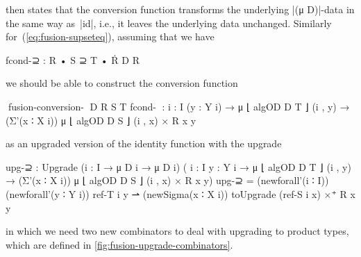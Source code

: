 then states that the conversion function transforms the underlying |(μ D)|-data in the same way as~|id|, i.e., it leaves the underlying data unchanged.
Similarly for~(\ref{eq:fusion-supseteq}), assuming that we have
\begin{code}
fcond-⊇ : R • S ⊇ T • Ṙ D R
\end{code}
we should be able to construct the conversion function
\begin{code}
^^^fusion-conversion-⊇ D R S T fcond-⊇ :
  {i : I} (y : Y i) → μ ⌊ algOD D T ⌋ (i , y) →
  (Σ'(x ∶ X i)) μ ⌊ algOD D S ⌋ (i , x) × R x y
\end{code}
as an upgraded version of the identity function with the upgrade
\begin{code}
upg-⊇ : Upgrade  ({i : I} → μ D i → μ D i)
                 (  {i : I} {y : Y i} → μ ⌊ algOD D T ⌋ (i , y) →
                    (Σ'(x ∶ X i)) μ ⌊ algOD D S ⌋ (i , x) × R x y)
upg-⊇ =  (newforall'(i ∶ I)) (newforall'(y ∶ Y i)) ref-T i y ⇀
         (newSigma(x ∶ X i)) toUpgrade (ref-S i x) ×⁺ R x y
\end{code}
in which we need two new combinators to deal with upgrading to product types, which are defined in \autoref{fig:fusion-upgrade-combinators}.

